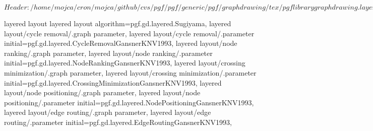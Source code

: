 %
%
%

\ProvidesFileRCS[v\pgfversion] $Header: /home/mojca/cron/mojca/github/cvs/pgf/pgf/generic/pgf/graphdrawing/tex/pgflibrarygraphdrawing.layered.code.tex,v 1.2 2012/04/19 13:49:07 tantau Exp $






%
%




%
%
\pgfgddeclarealgorithmkey
  {layered layout}
  {layered layout}
  {
    algorithm=pgf.gd.layered.Sugiyama,
    layered layout/cycle removal/.graph parameter,
    layered layout/cycle removal/.parameter initial=pgf.gd.layered.CycleRemovalGansnerKNV1993,
    layered layout/node ranking/.graph parameter,
    layered layout/node ranking/.parameter initial=pgf.gd.layered.NodeRankingGansnerKNV1993,
    layered layout/crossing minimization/.graph parameter,
    layered layout/crossing minimization/.parameter initial=pgf.gd.layered.CrossingMinimizationGansnerKNV1993,
    layered layout/node positioning/.graph parameter,
    layered layout/node positioning/.parameter initial=pgf.gd.layered.NodePositioningGansnerKNV1993,
    layered layout/edge routing/.graph parameter,
    layered layout/edge routing/.parameter initial=pgf.gd.layered.EdgeRoutingGansnerKNV1993,
  }




\endinput
